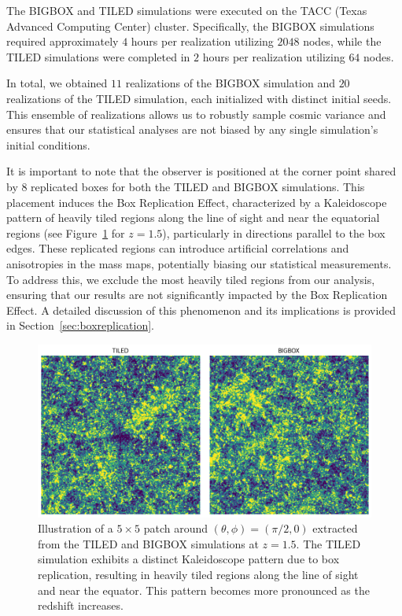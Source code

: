 The BIGBOX and TILED simulations were executed on the TACC (Texas Advanced Computing Center) cluster. Specifically, the BIGBOX simulations required approximately $4$ hours per realization utilizing $2048$ nodes, while the TILED simulations were completed in $2$ hours per realization utilizing $64$ nodes. 

In total, we obtained $11$ realizations of the BIGBOX simulation and $20$ realizations of the TILED simulation, each initialized with distinct initial seeds. This ensemble of realizations allows us to robustly sample cosmic variance and ensures that our statistical analyses are not biased by any single simulation's initial conditions. 

It is important to note that the observer is positioned at the corner point shared by $8$ replicated boxes for both the TILED and BIGBOX simulations. This placement induces the Box Replication Effect, characterized by a Kaleidoscope pattern of heavily tiled regions along the line of sight and near the equatorial regions (see Figure~\ref{fig:boxreplication_patch} for $z = 1.5$), particularly in directions parallel to the box edges. These replicated regions can introduce artificial correlations and anisotropies in the mass maps, potentially biasing our statistical measurements. To address this, we exclude the most heavily tiled regions from our analysis, ensuring that our results are not significantly impacted by the Box Replication Effect. A detailed discussion of this phenomenon and its implications is provided in Section~\ref{sec:boxreplication}.

\begin{figure}[ht]
    \centering
    \includegraphics[width=\textwidth]{figures/samplepatch.png}
    \caption[Illustration of a $5 \times 5$ patch at $z = 1.5$]{Illustration of a $5 \times 5$ patch around $(\theta, \phi)= (\pi/2, 0)$ extracted from the TILED and BIGBOX simulations at $z = 1.5$. The TILED simulation exhibits a distinct Kaleidoscope pattern due to box replication, resulting in heavily tiled regions along the line of sight and near the equator. This pattern becomes more pronounced as the redshift increases.}
    \label{fig:boxreplication_patch}
\end{figure}

